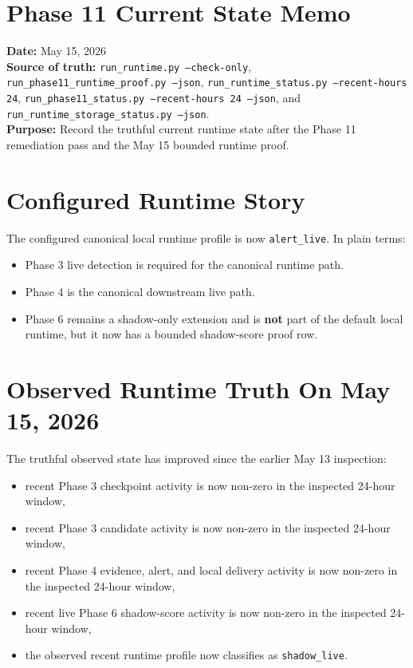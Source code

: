 \documentclass{article}
\begin{document}
\section*{Phase 11 Current State Memo}

\textbf{Date:} May 15, 2026\\
\textbf{Source of truth:} \texttt{run\_runtime.py --check-only}, \texttt{run\_phase11\_runtime\_proof.py --json}, \texttt{run\_runtime\_status.py --recent-hours 24}, \texttt{run\_phase11\_status.py --recent-hours 24 --json}, and \texttt{run\_runtime\_storage\_status.py --json}.\\
\textbf{Purpose:} Record the truthful current runtime state after the Phase 11 remediation pass and the May 15 bounded runtime proof.

\section*{Configured Runtime Story}
The configured canonical local runtime profile is now \texttt{alert\_live}. In plain terms:
\begin{itemize}
\item Phase 3 live detection is required for the canonical runtime path.
\item Phase 4 is the canonical downstream live path.
\item Phase 6 remains a shadow-only extension and is \textbf{not} part of the default local runtime, but it now has a bounded shadow-score proof row.
\end{itemize}

\section*{Observed Runtime Truth On May 15, 2026}
The truthful observed state has improved since the earlier May 13 inspection:
\begin{itemize}
\item recent Phase 3 checkpoint activity is now non-zero in the inspected 24-hour window,
\item recent Phase 3 candidate activity is now non-zero in the inspected 24-hour window,
\item recent Phase 4 evidence, alert, and local delivery activity is now non-zero in the inspected 24-hour window,
\item recent live Phase 6 shadow-score activity is now non-zero in the inspected 24-hour window,
\item the observed recent runtime profile now classifies as \texttt{shadow\_live}.
\end{itemize}
\end{document}
